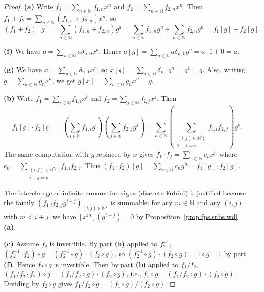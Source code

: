 \begin{proof}
\textbf{(a)} Write $f_1 = \sum_{n \in \mathbb{N}} f_{1,n} x^n$ and
$f_2 = \sum_{n \in \mathbb{N}} f_{2,n} x^n$. Then
$f_1 + f_2 = \sum_{n \in \mathbb{N}} (f_{1,n} + f_{2,n}) x^n$, so
\[
(f_1 + f_2)[g] = \sum_{n \in \mathbb{N}} (f_{1,n} + f_{2,n}) g^n
= \sum_{n \in \mathbb{N}} f_{1,n} g^n + \sum_{n \in \mathbb{N}} f_{2,n} g^n
= f_1[g] + f_2[g].
\]

\textbf{(f)} We have $\underline{a} = \sum_{n \in \mathbb{N}} a \delta_{n,0} x^n$.
Hence $\underline{a}[g] = \sum_{n \in \mathbb{N}} a \delta_{n,0} g^n
= a \cdot 1 + 0 = \underline{a}$.

\textbf{(g)} We have $x = \sum_{n \in \mathbb{N}} \delta_{n,1} x^n$, so
$x[g] = \sum_{n \in \mathbb{N}} \delta_{n,1} g^n = g^1 = g$. Also,
writing $g = \sum_{n \in \mathbb{N}} g_n x^n$, we get
$g[x] = \sum_{n \in \mathbb{N}} g_n x^n = g$.

\textbf{(b)} Write $f_1 = \sum_{i \in \mathbb{N}} f_{1,i} x^i$ and
$f_2 = \sum_{j \in \mathbb{N}} f_{2,j} x^j$. Then
\[
f_1[g] \cdot f_2[g]
= \left(\sum_{i \in \mathbb{N}} f_{1,i} g^i\right)
  \left(\sum_{j \in \mathbb{N}} f_{2,j} g^j\right)
= \sum_{n \in \mathbb{N}} \left(\sum_{\substack{(i,j) \in \mathbb{N}^2; \\ i+j=n}} f_{1,i} f_{2,j}\right) g^n.
\]
The same computation with $g$ replaced by $x$ gives
$f_1 \cdot f_2 = \sum_{n \in \mathbb{N}} c_n x^n$ where
$c_n = \sum_{\substack{(i,j) \in \mathbb{N}^2; \\ i+j=n}} f_{1,i} f_{2,j}$.
Thus $(f_1 \cdot f_2)[g] = \sum_{n \in \mathbb{N}} c_n g^n = f_1[g] \cdot f_2[g]$.

The interchange of infinite summation signs (discrete Fubini) is justified because
the family $(f_{1,i} f_{2,j} g^{i+j})_{(i,j) \in \mathbb{N}^2}$ is summable:
for any $m \in \mathbb{N}$ and any $(i,j)$ with $m < i+j$, we have
$[x^m](g^{i+j}) = 0$ by Proposition~\ref{prop.fps.subs.wd} \textbf{(a)}.

\textbf{(c)} Assume $f_2$ is invertible. By part \textbf{(b)} applied to $f_2^{-1}$,
$(f_2^{-1} \cdot f_2) \circ g = (f_2^{-1} \circ g) \cdot (f_2 \circ g)$, so
$(f_2^{-1} \circ g) \cdot (f_2 \circ g) = \underline{1} \circ g = \underline{1}$
by part \textbf{(f)}. Hence $f_2 \circ g$ is invertible. Then by part
\textbf{(b)} applied to $f_1/f_2$,
$(f_1/f_2 \cdot f_2) \circ g = (f_1/f_2 \circ g) \cdot (f_2 \circ g)$, i.e.,
$f_1 \circ g = (f_1/f_2 \circ g) \cdot (f_2 \circ g)$. Dividing by $f_2 \circ g$
gives $f_1/f_2 \circ g = (f_1 \circ g)/(f_2 \circ g)$.


\end{proof}
